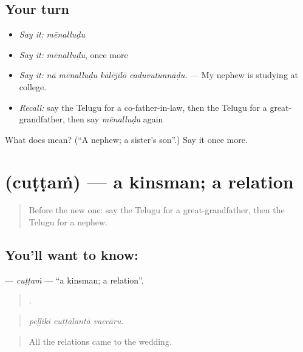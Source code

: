 \subsection*{Your turn}
\begin{itemize}
\raggedright
  \item \emph{Say it:} \emph{mēnalluḍu}
  \item \emph{Say it:} \emph{mēnalluḍu}, once more
  \item \emph{Say it:} \emph{nā mēnalluḍu kālējīlō caduvutunnāḍu.} — My nephew is studying at college.
  \item \emph{Recall:} say the Telugu for a co-father-in-law, then the Telugu for a great-grandfather, then say \emph{mēnalluḍu} again
\end{itemize}

\begin{tcolorbox}[breakable,colback=teal!4,colframe=teal!35!black,title={Before you move on}]
What does  mean? (\textquotedblleft{}A nephew; a sister's son\textquotedblright{}.) Say it once more.
\end{tcolorbox}
\section[\texorpdfstring{\te{చుట్టం} (cuṭṭaṁ)}{చుట్టం (cuṭṭaṁ)}]{ (cuṭṭaṁ) — a kinsman; a relation}

\label{lesson:TE-C530-cuttam}



\begin{quote}
Before the new one: say the Telugu for a great-grandfather, then the Telugu for a nephew.
\end{quote}

\subsection*{You'll want to know: }
\textbf{} — \emph{cuṭṭaṁ} — \textquotedblleft{}a kinsman; a relation\textquotedblright{}.

\begin{quote}
  .
\end{quote}

\begin{quote}
\emph{peḷḷiki cuṭṭālantā vaccāru.}
\end{quote}

\begin{quote}
All the relations came to the wedding.
\end{quote}

